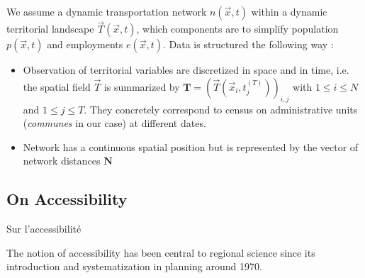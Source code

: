 We assume a dynamic transportation network $n(\vec{x},t)$ within a dynamic territorial landscape $\vec{T}(\vec{x},t)$, which components are to simplify population $p(\vec{x},t)$ and employments $e(\vec{x},t)$. Data is structured the following way :
\begin{itemize}
\item Observation of territorial variables are discretized in space and in time, i.e. the spatial field $\vec{T}$ is summarized by $\mathbf{T} = \left(\vec{T}(\vec{x}_i,t_j^{(T)})\right)_{i,j}$ with $1\leq i \leq N$ and $1\leq j \leq T$. They concretely correspond to census on administrative units (\emph{communes} in our case) at different dates.
\item Network has a continuous spatial position but is represented by the vector of network distances $\mathbf{N}$ 
\end{itemize}






\subsection{On Accessibility}{Sur l'accessibilité}


The notion of accessibility has been central to regional science since its introduction and systematization in planning around 1970. 



